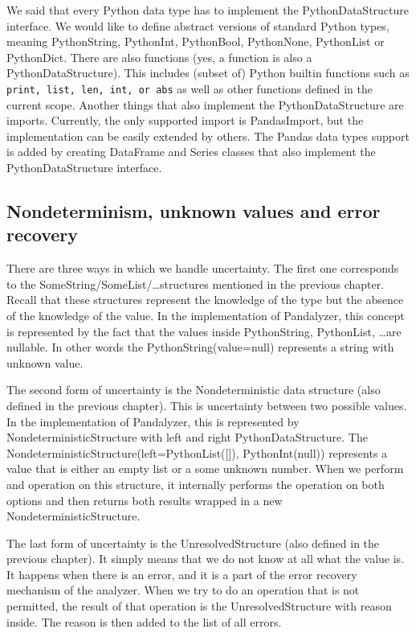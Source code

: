 We said that every Python data type has to implement the PythonDataStructure interface.
We would like to define abstract versions of standard Python types, meaning PythonString, PythonInt, PythonBool,
PythonNone, PythonList or PythonDict.
There are also functions (yes, a function is also a PythonDataStructure).
This includes (subset of) Python builtin functions such as \verb|print, list, len, int, or abs| as well as other
functions defined in the current scope.
Another things that also implement the PythonDataStructure are imports.
Currently, the only supported import is PandasImport, but the implementation can be easily extended by others.
The Pandas data types support is added by creating DataFrame and Series classes that also implement the PythonDataStructure
interface.

\subsection{Nondeterminism, unknown values and error recovery}\label{subsec:nondeterminism}

There are three ways in which we handle uncertainty.
The first one corresponds to the SomeString/SomeList/\ldots structures mentioned in the previous chapter.
Recall that these structures represent the knowledge of the type but the absence of the knowledge of the value.
In the implementation of Pandalyzer, this concept is represented by the fact that the values inside PythonString,
PythonList, \ldots are nullable.
In other words the PythonString(value=null) represents a string with unknown value.

The second form of uncertainty is the Nondeterministic data structure (also defined in the previous chapter).
This is uncertainty between two possible values.
In the implementation of Pandalyzer, this is represented by NondeterministicStructure with left and right
PythonDataStructure.
The NondeterministicStructure(left=PythonList([]), PythonInt(null)) represents a value that is either an empty list or a
some unknown number.
When we perform and operation on this structure, it internally performs the operation on both options and then
returns both results wrapped in a new NondeterministicStructure.

The last form of uncertainty is the UnresolvedStructure (also defined in the previous chapter).
It simply means that we do not know at all what the value is.
It happens when there is an error, and it is a part of the error recovery mechanism of the analyzer.
When we try to do an operation that is not permitted, the result of that operation is the UnresolvedStructure with
reason inside.
The reason is then added to the list of all errors.

